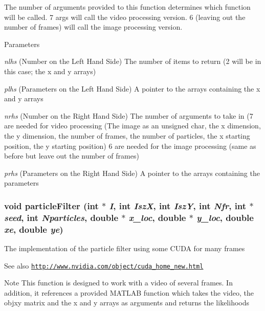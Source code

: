 The number of arguments provided to this function determines which function will be called. 7 args will call the video processing version. 6 (leaving out the number of frames) will call the image processing version. 
\begin{DoxyParams}{Parameters}
\item[{\em nlhs}](Number on the Left Hand Side) The number of items to return (2 will be in this case; the x and y arrays) \item[{\em plhs}](Parameters on the Left Hand Side) A pointer to the arrays containing the x and y arrays \item[{\em nrhs}](Number on the Right Hand Side) The number of arguments to take in (7 are needed for video processing (The image as an unsigned char, the x dimension, the y dimension, the number of frames, the number of particles, the x starting position, the y starting position) 6 are needed for the image processing (same as before but leave out the number of frames) \item[{\em prhs}](Parameters on the Right Hand Side) A pointer to the arrays containing the parameters \end{DoxyParams}
\hypertarget{ex__particle__CUDA__naive_8cu_a31746ff3055946c596437a94b1e7fcd9}{
\subsubsection[{particleFilter}]{\setlength{\rightskip}{0pt plus 5cm}void particleFilter (int $\ast$ {\em I}, \/  int {\em IszX}, \/  int {\em IszY}, \/  int {\em Nfr}, \/  int $\ast$ {\em seed}, \/  int {\em Nparticles}, \/  double $\ast$ {\em x\_\-loc}, \/  double $\ast$ {\em y\_\-loc}, \/  double {\em xe}, \/  double {\em ye})}}
\label{ex__particle__CUDA__naive_8cu_a31746ff3055946c596437a94b1e7fcd9}
The implementation of the particle filter using some CUDA for many frames \begin{DoxySeeAlso}{See also}
\href{http://www.nvidia.com/object/cuda_home_new.html}{\tt http://www.nvidia.com/object/cuda\_\-home\_\-new.html} 
\end{DoxySeeAlso}
\begin{DoxyNote}{Note}
This function is designed to work with a video of several frames. In addition, it references a provided MATLAB function which takes the video, the objxy matrix and the x and y arrays as arguments and returns the likelihoods 
\end{DoxyNote}


